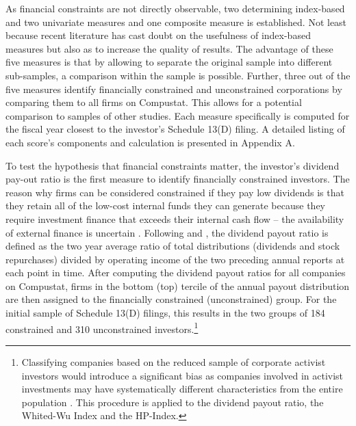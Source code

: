 \documentclass[12pt]{article}
\begin{document}
\noindent As financial constraints are not directly observable, two determining index-based and two univariate measures and one composite measure is established. Not least because recent literature has cast doubt on the usefulness \citep[p.109]{Khatami2014} of index-based measures but also as to increase the quality of results. The advantage of these five measures is that by allowing to separate the original sample into different sub-samples, a comparison within the sample is possible. Further, three out of the five measures identify financially constrained and unconstrained corporations by comparing them to all firms on Compustat. This allows for a potential comparison to samples of other studies. Each measure specifically is computed for the fiscal year closest to the investor's Schedule 13(D) filing. A detailed listing of each score's components and calculation is presented in Appendix A.\par
To test the hypothesis that financial constraints matter, the investor's dividend pay-out ratio is the first measure to identify financially constrained investors. The reason why firms can be considered constrained if they pay low dividends is that they retain all of the low-cost internal funds they can generate because they require investment finance that exceeds their internal cash flow  -- the availability of external finance is uncertain \citep[p.158]{Fazzari1988}. Following \citet{Almeida2004} and \citet[p.119]{Khatami2014}, the dividend payout ratio is defined as the two year average ratio of total distributions (dividends and stock repurchases) divided by operating income of the two preceding annual reports at each point in time. After computing the dividend payout ratios for all companies on Compustat, firms in the bottom (top) tercile of the annual payout distribution are then assigned to the financially constrained (unconstrained) group. For the initial sample of Schedule 13(D) filings, this results in the two groups of 184 constrained and 310 unconstrained investors.\footnote{Classifying companies based on the reduced sample of corporate activist investors would introduce a significant bias as companies involved in activist investments may have systematically different characteristics from the entire population \citep[p.109]{Khatami2014}. This procedure is applied to the dividend payout ratio, the Whited-Wu Index and the HP-Index.}\par
\end{document}
